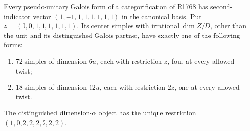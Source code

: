 \begin{proposition}
\label{prop:creative-r1768-sector}
Every pseudo-unitary Galois form of a categorification of R1768 has second-indicator vector
$(1,-1,1,1,1,1,1,1)$ in the canonical basis.
Put $z=(0,0,1,1,1,1,1,1)$. Its center simples with irrational $\dim Z/D$, other than the unit
and its distinguished Galois partner, have exactly one of the following
forms:
\begin{enumerate}
\item $72$ simples of dimension $6u$, each with restriction $z$,
      four at every allowed twist;
\item $18$ simples of dimension $12u$, each with restriction $2z$,
      one at every allowed twist.
\end{enumerate}
The distinguished dimension-$\alpha$ object has the unique restriction
$(1,0,2,2,2,2,2,2)$.
\end{proposition}
